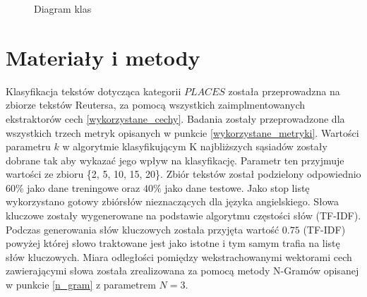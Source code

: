 \documentclass{classrep}
\begin{document}
\begin{figure}[h!]
    \centering
    \caption{Diagram klas}
    \label{fig:uml}
\end{figure}

\section{Materiały i metody} \label{mat}
Klasyfikacja tekstów dotycząca kategorii $PLACES$ została przeprowadzna na zbiorze tekstów Reutersa, za
pomocą wszystkich zaimplmentowanych ekstraktorów cech \ref{wykorzystane_cechy}. Badania zostały
przeprowadzone dla wszystkich trzech metryk opisanych w punkcie \ref{wykorzystane_metryki}. Wartości
parametru $k$ w algorytmie klasyfikującym K najbliższych sąsiadów zostały dobrane tak aby wykazać jego
wpływ na klasyfikację. Parametr ten przyjmuje wartości ze zbioru \{2, 5, 10, 15, 20\}. Zbiór tekstów
został podzielony odpowiednio $60\%$ jako dane treningowe oraz $40\%$ jako dane testowe. Jako stop listę
wykorzystano gotowy zbiór\footnotemark[1] słów nieznaczących dla języka angielskiego.
Słowa kluczowe zostały wygenerowane na podstawie algorytmu częstości słów (TF-IDF). Podczas generowania
słów kluczowych została przyjęta wartość $0.75$ (TF-IDF) powyżej której słowo traktowane jest jako istotne i
tym samym trafia na listę słów kluczowych. Miara odległości pomiędzy wekstrachowanymi wektorami cech zawierającymi słowa
została zrealizowana za pomocą metody N-Gramów opisanej w punkcie \ref{n_gram} z parametrem $N=3$.
\end{document}
